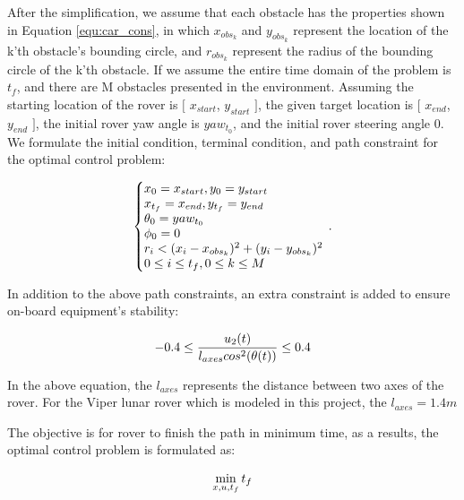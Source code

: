 \documentclass{article}
\begin{document}
After the simplification, we assume that each obstacle has the properties shown in Equation \ref{equ:car_cons}, in which \(x_{obs_{k}}\) and \(y_{obs_{k}}\) represent the location of the k'th obstacle's bounding circle, and \(r_{obs_{k}}\) represent the radius of the bounding circle of the k'th obstacle. If we assume the entire time domain of the problem is $t_{f}$, and there are M obstacles presented in the environment. Assuming the starting location of the rover is \([\) \(x_{start}\), \(y_{start}\) \(]\), the given target location is \([\) \(x_{end}\), \(y_{end}\) \(]\), the initial rover yaw angle is $yaw_{t_{0}}$, and the initial rover steering angle $0$. We formulate the initial condition, terminal condition, and path constraint for the optimal control problem: 

\begin{equation}
	\label{equ:car_cons}
	\left\{\begin{array}{@{}l@{}}
		x_{0} = x_{start}, y_{0} = y_{start}  \\
		x_{t_{f}} = x_{end}, y_{t_{f}} = y_{end}  \\
		\theta_{0}=yaw_{t_{0}}  \\
		\phi_{0} = 0 \\
		r_{i} < (x_{i}-x_{obs_{k}})^2 + (y_{i}-y_{obs_{k}})^2  \\
		0 \leq i \leq t_{f}, 0 \leq k \leq M \\
	\end{array}\right.\,.
\end{equation}

In addition to the above path constraints, an extra constraint is added to ensure on-board equipment's stability:

\begin{equation}
	\label{equ:car_stability}
	-0.4 \leq \frac{u_{2}(t)}{l_{axes}cos^{2}(\theta(t) )} \leq 0.4 \\
\end{equation}

In the above equation, the $l_{axes}$ represents the distance between two axes of the rover. For the Viper lunar rover which is modeled in this project, the $l_{axes} = 1.4 m$

The objective is for rover to finish the path in minimum time, as a results, the optimal control problem is formulated as:

\begin{equation}
	\label{equ:car_opt}
	\min_{x,u,t_{f}}t_{f}\\
\end{equation}
\end{document}
